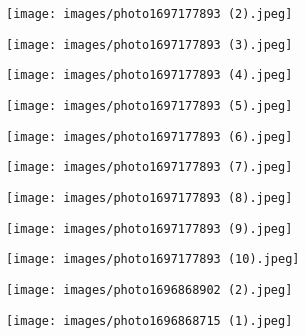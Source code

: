 \documentclass{article}
\begin{document}
\begin{flushleft}
    \centering
    \texttt{[image: images/photo1697177893 (2).jpeg]}
\end{flushleft}

\begin{flushleft}
    \centering
    \texttt{[image: images/photo1697177893 (3).jpeg]}
\end{flushleft}

\begin{flushleft}
    \centering
    \texttt{[image: images/photo1697177893 (4).jpeg]}
\end{flushleft}

\begin{flushleft}
    \centering
    \texttt{[image: images/photo1697177893 (5).jpeg]}
\end{flushleft}

\begin{flushleft}
    \centering
    \texttt{[image: images/photo1697177893 (6).jpeg]}
\end{flushleft}

\begin{flushleft}
    \centering
    \texttt{[image: images/photo1697177893 (7).jpeg]}
\end{flushleft}

\begin{flushleft}
    \centering
    \texttt{[image: images/photo1697177893 (8).jpeg]}
\end{flushleft}

\begin{flushleft}
    \centering
    \texttt{[image: images/photo1697177893 (9).jpeg]}
\end{flushleft}

\begin{flushleft}
    \centering
    \texttt{[image: images/photo1697177893 (10).jpeg]}
\end{flushleft}

\begin{flushleft}
    \centering
    \texttt{[image: images/photo1696868902 (2).jpeg]}
\end{flushleft}

\begin{flushleft}
    \centering
    \texttt{[image: images/photo1696868715 (1).jpeg]}
\end{flushleft}


\end{document}
